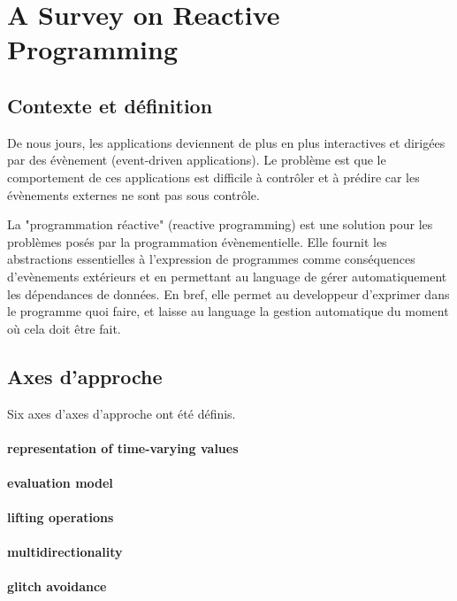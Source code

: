 \documentclass[11pt]{article}
\begin{document}
{\centering
\section*{A Survey on Reactive Programming}}
\begin{multicols}{2}

\subsection*{Contexte et définition}
De nous jours, les applications deviennent de plus en plus interactives et dirigées par des évènement (event-driven applications). Le problème est que le comportement de ces applications est difficile à contrôler et à prédire car les évènements externes ne sont pas sous contrôle.

La "programmation réactive" (reactive programming) est une solution pour les problèmes posés par la programmation évènementielle. Elle fournit les abstractions essentielles à l'expression de programmes comme conséquences d'evènements extérieurs et en permettant au language de gérer automatiquement les dépendances de données. En bref, elle permet au developpeur d'exprimer dans le programme quoi faire, et laisse au language la gestion automatique du moment où cela doit être fait.

\subsection*{Axes d'approche}
Six axes d'axes d'approche ont été définis.

\paragraph{representation of time-varying values}

\paragraph{evaluation model}

\paragraph{lifting operations}

\paragraph{multidirectionality}

\paragraph{glitch avoidance}


\end{multicols}
\end{document}
